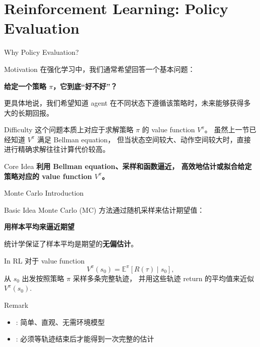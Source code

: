 \documentclass[aspectratio=169]{beamer}
\begin{document}
\section{Reinforcement Learning: Policy Evaluation}

\begin{frame}{Why Policy Evaluation?}
    \begin{block}{Motivation}
        在强化学习中，我们通常希望回答一个基本问题：

        \begin{center}
            \textbf{给定一个策略 $\pi$，它到底“好不好”？}
        \end{center}

        更具体地说，我们希望知道 agent 在不同状态下遵循该策略时，未来能够获得多大的长期回报。
    \end{block}
    \begin{block}{Difficulty}
        这个问题本质上对应于求解策略 $\pi$ 的 value function $V^\pi$。
        虽然上一节已经知道 $V^\pi$ 满足 Bellman equation，
        但当状态空间较大、动作空间较大时，直接进行精确求解往往计算代价较高。
    \end{block}
    \begin{block}{Core Idea}
        \textbf{利用 Bellman equation、采样和函数逼近，
        高效地估计或拟合给定策略对应的 value function $V^\pi$。}
    \end{block}
\end{frame}

\begin{frame}{Monte Carlo Introduction}
    \begin{block}{Basic Idea}
        Monte Carlo (MC) 方法通过随机采样来估计期望值：
        \begin{center}
            \textbf{用样本平均来逼近期望}
        \end{center}
        统计学保证了样本平均是期望的\textbf{无偏估计}。
    \end{block}
    \begin{block}{In RL}
        对于 value function
        \[
            V^\pi(s_0)=\mathbb{E}^\pi\!\left[R(\tau)\mid s_0\right],
        \]
        从 $s_0$ 出发按照策略 $\pi$ 采样多条完整轨迹，
        并用这些轨迹 return 的平均值来近似 $V^\pi(s_0)$.
    \end{block}
    \begin{block}{Remark}
        \begin{itemize}
            \item[Pros]: 简单、直观、无需环境模型
            \item[Cons]: 必须等轨迹结束后才能得到一次完整的估计
        \end{itemize}
    \end{block}
\end{frame}
\end{document}
